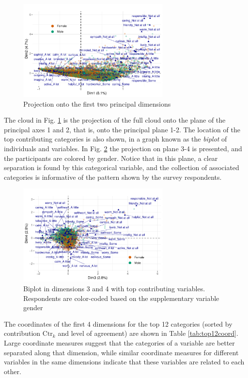 \documentclass[conference,final,]{IEEEtran}
\begin{document}
\begin{figure}[h!] 
\centering 
\includegraphics[width=3in]{../figs/newbiplot12.pdf}
\caption{Projection onto the first two principal dimensions}
\label{fig:biplot} 
\end{figure}

The cloud in Fig. \ref{fig:biplot} is the projection of the full cloud
onto the plane of the principal axes 1 and 2, that is, onto the
principal plane 1-2. The location of the top contributing categories is
also shown, in a graph known as the \emph{biplot} of individuals and
variables. In Fig. \ref{fig:plane34} the projection on plane 3-4 is
presented, and the participants are colored by gender. Notice that in
this plane, a clear separation is found by this categorical variable,
and the collection of associated categories is informative of the
pattern shown by the survey respondents.

\begin{figure}[!ht] 
\centering 
\includegraphics[width=3in]{../figs/newbiplot34.pdf}
\caption{Biplot in dimensions 3 and 4 with top contributing variables. Respondents are color-coded based on the supplementary variable gender}
\label{fig:plane34} 
\end{figure}

The coordinates of the first 4 dimensions for the top 12 categories
(sorted by contribution \(\text{Ctr}_k\) and level of agreement) are
shown in Table \ref{tab:top12coord}. Large coordinate measures suggest
that the categories of a variable are better separated along that
dimension, while similar coordinate measures for different variables in
the same dimensions indicate that these variables are related to each
other.
\end{document}
